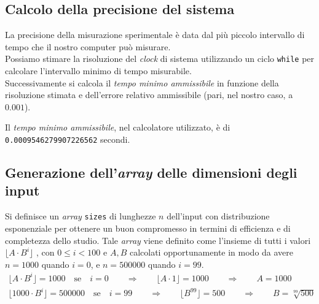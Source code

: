 \documentclass[11pt,a4paper,italian]{article}
\begin{document}
\subsection{Calcolo della precisione del sistema}
La precisione della misurazione sperimentale è data dal più piccolo intervallo di tempo che il nostro computer può misurare.\\
Possiamo stimare la risoluzione del \textit{clock} di sistema utilizzando un ciclo \texttt{while} per calcolare l'intervallo minimo di tempo misurabile.\\
Successivamente si calcola il \textit{tempo minimo ammissibile} in funzione della risoluzione stimata e dell'errore relativo ammissibile (pari, nel nostro caso, a $0.001$).

Il \textit{tempo minimo ammissibile}, nel calcolatore utilizzato, è di \texttt{0.0009546279907226562} secondi.

\subsection{Generazione dell'\textit{array} delle dimensioni degli input}
Si definisce un \textit{array} \texttt{sizes} di lunghezze $n$ dell'input con distribuzione esponenziale per ottenere un buon compromesso in termini di efficienza e di completezza dello studio. Tale \textit{array} viene definito come l'insieme di tutti i valori  $ \bigl\lfloor A \cdot B^i \bigl\rfloor $ , con $ 0 \leq i <  100 $ e $A, B$ calcolati opportunamente in modo da avere $n = 1000$ quando $i = 0$, e $n = 500000$ quando $i = 99$.
\begin{gather*}
\bigl\lfloor A \cdot B^i \bigl\rfloor = 1000 \quad \text{se} \quad i = 0 \qquad \Rightarrow \qquad \bigl\lfloor A \cdot 1 \bigl\rfloor = 1000 \qquad \Rightarrow \qquad A = 1000\\
\bigl\lfloor 1000 \cdot B^i \bigl\rfloor = 500000 \quad \text{se} \quad i = 99 \qquad \Rightarrow \qquad \bigl\lfloor B^{99} \bigl\rfloor = 500 \qquad \Rightarrow \qquad B = \sqrt[99]{500}
\end{gather*}


\begin{center}
\end{center}
\end{document}
